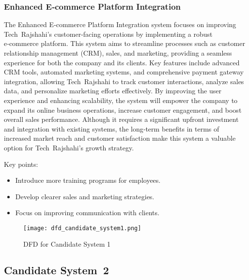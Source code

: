 \documentclass[12pt,a4paper]{article}
\begin{document}
\subsubsection*{Enhanced E‑commerce Platform Integration} 
The Enhanced E‑commerce Platform Integration system focuses on improving Tech Rajshahi’s customer‑facing operations by implementing a robust e‑commerce platform.  This system aims to streamline processes such as customer relationship management (CRM), sales, and marketing, providing a seamless experience for both the company and its clients.  Key features include advanced CRM tools, automated marketing systems, and comprehensive payment gateway integration, allowing Tech Rajshahi to track customer interactions, analyze sales data, and personalize marketing efforts effectively.  By improving the user experience and enhancing scalability, the system will empower the company to expand its online business operations, increase customer engagement, and boost overall sales performance.  Although it requires a significant upfront investment and integration with existing systems, the long‑term benefits in terms of increased market reach and customer satisfaction make this system a valuable option for Tech Rajshahi’s growth strategy.

Key points:
\begin{itemize}
    \item Introduce more training programs for employees.
    \item Develop clearer sales and marketing strategies.
    \item Focus on improving communication with clients.
\end{itemize}

\begin{figure}[H]
    \centering
    \texttt{[image: dfd\_candidate\_system1.png]}
      \caption{DFD for Candidate System 1}
    \label{fig:dfd_candidate_system1}
\end{figure}

\subsection*{Candidate System 2}
\end{document}
